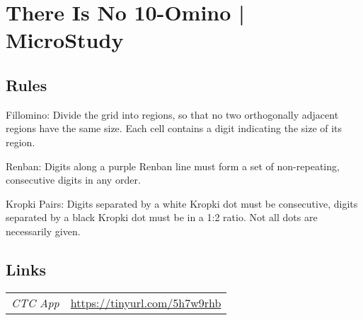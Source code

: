 \section{There Is No 10-Omino | {\normalfont MicroStudy}}
\label{sec:18-there-is-no-10-omino-microstudy}

\subsection*{Rules}
\begin{markdown}
Fillomino: Divide the grid into regions, so that no two orthogonally adjacent regions have the same size. Each cell contains a digit indicating the size of its region.



Renban: Digits along a purple Renban line must form a set of non-repeating, consecutive digits in any order.



Kropki Pairs: Digits separated by a white Kropki dot must be consecutive, digits separated by a black Kropki dot must be in a 1:2 ratio. Not all dots are necessarily given.
\end{markdown}
\subsection*{Links}
\begin{tabularx}{\textwidth}{l X}
\emph{CTC App} & \url{https://tinyurl.com/5h7w9rhb} \\
\end{tabularx}
\pagebreak
